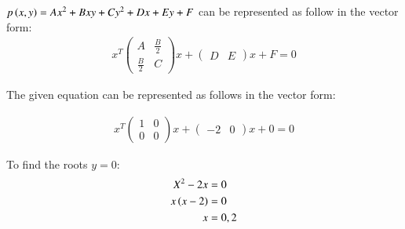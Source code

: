 \solution $p\left(x, y\right) = Ax^2 + Bxy + Cy^2 + Dx + Ey + F$ can be represented as follow in the vector form:
\begin{align}
x^T 
\begin{pmatrix}
A & \frac{B}{2} \\
\frac{B}{2} & C
\end{pmatrix}
x + 
\begin{pmatrix}
D & E 
\end{pmatrix}
x + F = 0
\end{align}

\begin{flushleft}
The given equation can be represented as follows in the vector form:
\end{flushleft}
\begin{align}
x^T 
\begin{pmatrix}
1 & 0 \\
0 & 0
\end{pmatrix}
x + 
\begin{pmatrix}
-2 & 0 
\end{pmatrix}
x + 0 = 0
\end{align}

To find the roots $y=0$:
\begin{align}
X^2 - 2x &= 0 \\
x\left(x-2\right) &= 0 \\
x &= 0,2
\end{align}
